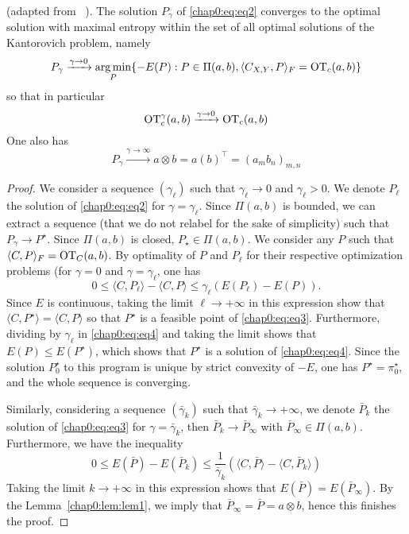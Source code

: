 \begin{proposition}
(adapted from ~\cite{COT19}). The solution $P_{\gamma}$ of  \eqref{chap0:eq:eq2} converges to the optimal solution with maximal entropy within the set of all optimal solutions of the Kantorovich problem, namely
\begin{equation}
\label{chap0:eq:eq3}
P_{\gamma} \xrightarrow{\gamma \rightarrow 0} \operatorname*{arg\,min}_{P} \{  -E(P): P \in \Pi(a, b), \langle C_{X,Y}, P \rangle_F = \mathrm{OT}_c(a, b)\}
\end{equation}
so that in particular
\begin{equation*}
\mathrm{OT}^{\gamma}_c(a, b) \xrightarrow{\gamma \rightarrow 0} \mathrm{OT}_c(a, b)
\end{equation*}
One also has
\begin{equation*}
P_{\gamma} \xrightarrow{\gamma \rightarrow \infty} a \otimes b =a (b)^{\top} = (a_m b_{n})_{m,n}
\end{equation*}
\end{proposition}
\begin{proof}
We consider a sequence $(\gamma_\ell)$ such that $\gamma_{\ell} \rightarrow 0$ and $\gamma_\ell >0$. We denote $P_\ell$ the solution of \eqref{chap0:eq:eq2} for $\gamma =\gamma_\ell$. Since $\Pi(a, b)$ is bounded, we can extract a sequence (that we do not relabel for the sake of simplicity) such that $P_\gamma \rightarrow P^{\star}$. Since $\Pi(a, b)$ is closed, $P_{\star} \in \Pi(a, b)$. We consider any $P$ such that $\langle C, P \rangle_F = \mathrm{OT}_{C} (a, b)$. By optimality of $P$ and $P_{\ell}$ for their respective optimization problems (for $\gamma =0$ and $\gamma = \gamma_{\ell}$, one has 
\begin{equation}
\label{chap0:eq:eq4}
0 \leq \langle C, P_\ell \rangle  -\langle C, P \rangle \leq \gamma_\ell \left( E(P_\ell) -E(P) \right).
\end{equation} 
Since $E$ is continuous, taking the limit $\ell \rightarrow +\infty$ in this expression show that $\langle C, P^{\star} \rangle = \langle C, P \rangle$ so that $P^{\star}$ is a feasible point of \eqref{chap0:eq:eq3}. Furthermore, dividing by $\gamma_\ell$ in \eqref{chap0:eq:eq4} and taking the limit shows that $E(P) \leq  E(P^{\star})$, which shows that $P^{\star}$ is a solution of  \eqref{chap0:eq:eq4}. Since the solution $P^{\star}_{0}$ to this program is unique by strict convexity of $-E$, one has $P^\star = π^\star_0$, and the whole sequence is converging. 

Similarly, considering a sequence $(\bar{\gamma}_k)$ such that $\bar{\gamma}_k \rightarrow +\infty$, we denote $\bar{P}_k$ the solution of \eqref{chap0:eq:eq3} for $\gamma = \bar{\gamma}_k$, then $\bar{P}_k \rightarrow \bar{P}_{\infty} $ with  $\bar{P}_\infty \in \Pi(a, b)$. Furthermore, we have the inequality 
\begin{equation*}
0 \leq E(\bar{P}) - E(\bar{P}_k) \leq \frac{1}{\bar{\gamma}_k} \left( \langle C, \bar{P} \rangle  - \langle C, \bar{P}_k \rangle \right)
\end{equation*}
Taking the limit $k\rightarrow +\infty$ in this expression shows that $E(\bar{P}) = E(\bar{P}_\infty)$. By the Lemma~\ref{chap0:lem:lem1}, we imply that $\bar{P}_\infty = \bar{P} = a \otimes b$, hence this finishes the proof.
\end{proof}
